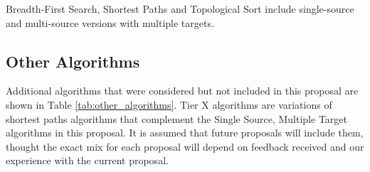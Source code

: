 Breadth-First Search, Shortest Paths and Topological Sort include single-source and multi-source versions with multiple targets.

\subsection{Other Algorithms}
Additional algorithms that were considered but not included in this proposal are shown in Table \ref{tab:other_algorithms}. 
Tier X algorithms are variations of shortest paths algorithms that complement the Single Source, Multiple Target algorithms 
in this proposal.
It is assumed that future proposals will include them, thought the exact mix for each proposal will depend on feedback received
and our experience with the current proposal.


